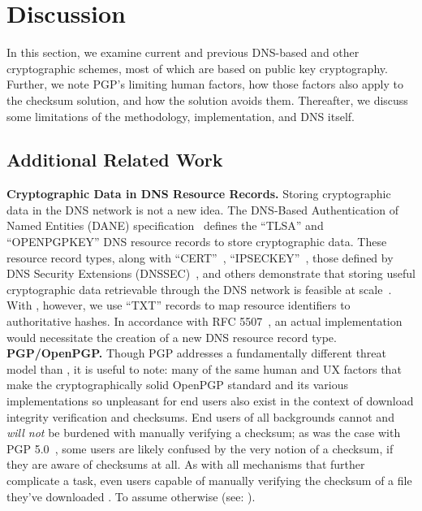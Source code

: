 \section{Discussion} \label{sec:discussion}

In this section, we examine current and previous DNS-based and other
cryptographic schemes, most of which are based on public key cryptography.
Further, we note PGP's limiting human factors, how those factors also apply to
the checksum solution, and how the \SYSTEM{} solution avoids them. Thereafter,
we discuss some limitations of the \SYSTEM{} methodology, implementation, and
DNS itself.

\subsection{Additional Related Work}

\noindent\textbf{Cryptographic Data in DNS Resource Records.}    Storing
cryptographic data in the DNS network is not a new idea. The DNS-Based
Authentication of Named Entities (DANE) specification~\cite{DANE1, DANE2, DANE3}
defines the ``TLSA'' and ``OPENPGPKEY'' DNS resource records to store
cryptographic data. These resource record types, along with
``CERT''~\cite{CERT}, ``IPSECKEY''~\cite{IPSECKEY}, those defined by DNS
Security Extensions (DNSSEC)~\cite{DNSSEC}, and others demonstrate that storing
useful cryptographic data retrievable through the DNS network is feasible at
scale~\cite{DANE3, DANE1}. With \SYSTEM{}, however, we use ``TXT'' records to
map resource identifiers to authoritative hashes. In accordance with RFC
5507~\cite{RFC5507}, an actual \SYSTEM{} implementation would necessitate the
creation of a new DNS resource record type. \\

\noindent\textbf{PGP/OpenPGP.}    Though PGP addresses a fundamentally different
threat model than \SYSTEM{}, it is useful to note: many of the same human and UX
factors that make the cryptographically solid OpenPGP standard and its various
implementations so unpleasant for end users also exist in the context of
download integrity verification and checksums. End users of all backgrounds
cannot and \textit{will not} be burdened with manually verifying a checksum; as
was the case with PGP 5.0~\cite{PGPBad}, some users are likely confused by the
very notion of a checksum, if they are aware of checksums at all. As with all
mechanisms that further complicate a task, even users capable of manually
verifying the checksum of a file they've downloaded . To assume otherwise (see:
).

